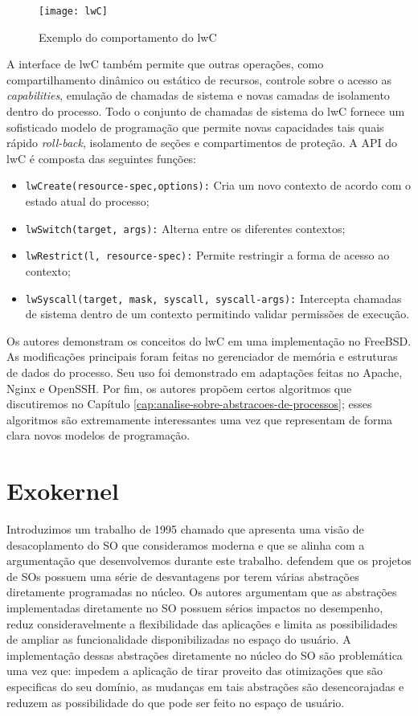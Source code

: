 \begin{figure}[!h]
  \centering
  \texttt{[image: lwC]} 
  \caption{Exemplo do comportamento do lwC}
  \label{fig:lwc} 
\end{figure}

A interface de lwC também permite que outras operações, como compartilhamento
dinâmico ou estático de recursos, controle sobre o acesso as
\emph{capabilities}, emulação de chamadas de sistema e novas camadas de
isolamento dentro do processo. Todo o conjunto de chamadas de sistema do lwC
fornece um sofisticado modelo de programação que permite novas capacidades
tais quais rápido \emph{roll-back}, isolamento de seções e compartimentos de
proteção. A API do lwC é composta das seguintes funções:

\begin{itemize}
  \item \texttt{lwCreate(resource-spec,options):} Cria um novo contexto de acordo com o estado atual do processo;
  \item \texttt{lwSwitch(target, args):} Alterna entre os diferentes contextos;
  \item \texttt{lwRestrict(l, resource-spec):} Permite restringir a forma de acesso ao contexto;
  \item \texttt{lwSyscall(target, mask, syscall, syscall-args):} Intercepta chamadas de sistema dentro de um contexto permitindo validar permissões de execução.
\end{itemize}

Os autores demonstram os conceitos do lwC em uma implementação no FreeBSD. As
modificações principais foram feitas no gerenciador de memória e estruturas de
dados do processo. Seu uso foi demonstrado em adaptações feitas no Apache,
Nginx e OpenSSH. Por fim, os autores propõem certos algoritmos que discutiremos
no Capítulo \ref{cap:analise-sobre-abstracoes-de-processos}; esses algoritmos
são extremamente interessantes uma vez que representam de forma clara novos
modelos de programação.

\section{Exokernel}
\label{sec:exokernel}

Introduzimos um trabalho de 1995 chamado que apresenta uma visão
de desacoplamento do SO que consideramos moderna e que se alinha com a
argumentação que desenvolvemos durante este trabalho. \citet{exokernel}
defendem que os projetos de SOs possuem uma série de desvantagens por terem
várias abstrações diretamente programadas no núcleo. Os autores argumentam que
as abstrações implementadas diretamente no SO possuem sérios impactos no
desempenho, reduz consideravelmente a flexibilidade das aplicações e limita as
possibilidades de ampliar as funcionalidade disponibilizadas no espaço do
usuário. A implementação dessas abstrações diretamente no núcleo do SO são
problemática uma vez que: impedem a aplicação de tirar proveito das otimizações
que são especificas do seu domínio, as mudanças em tais abstrações são
desencorajadas e reduzem as possibilidade do que pode ser feito no espaço de
usuário.

